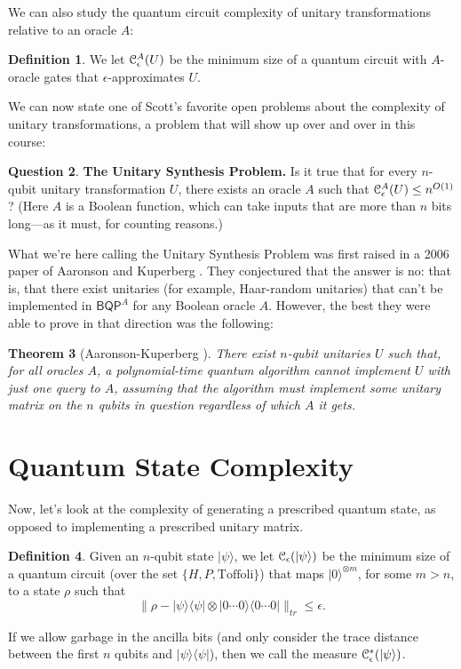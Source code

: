 \documentclass[12pt]{report}
\theoremstyle{plain}
\newtheorem{theorem}{Theorem}[section]
\theoremstyle{definition}
\newtheorem{definition}[theorem]{Definition}
\newtheorem{question}[theorem]{Question}
\renewcommand{\ket}[1]{|#1\rangle}
\newcommand{\ketbra}[2]{|#1\rangle\!\langle#2|}
\begin{document}
We can also study the quantum circuit complexity of unitary transformations relative to an oracle $A$:

\begin{definition}
We let ${\cal C}^A_{\epsilon}(U)$ be the minimum size of a quantum circuit with $A$-oracle gates that $\epsilon$-approximates $U$.
\end{definition}

We can now state one of Scott's favorite open problems about the complexity of unitary transformations, a problem that will show up over and over in this course:

\begin{question}
{\bf The Unitary Synthesis Problem.} Is it true that for every $n$-qubit unitary transformation $U$, there exists an oracle $A$ such that ${\cal C}^A_{\epsilon}(U)\leq n^{O(1)}$? (Here $A$ is a Boolean function, which can take inputs that are more than $n$ bits long---as it must, for counting reasons.)
\end{question}

What we're here calling the Unitary Synthesis Problem was first raised in a 2006 paper of Aaronson and Kuperberg \cite{ak}.  They conjectured that the answer is no: that is, that there exist unitaries (for example, Haar-random unitaries) that can't be implemented in $\mathsf{BQP}^A$ for any Boolean oracle $A$. However, the best they were able to prove in that direction was the following:

\begin{theorem}[Aaronson-Kuperberg \cite{ak}]
There exist $n$-qubit unitaries $U$ such that, for all oracles $A$, a polynomial-time quantum algorithm cannot implement $U$ with just one query to $A$, assuming that the algorithm must implement {\em some} unitary matrix on the $n$ qubits in question regardless of which $A$ it gets.
\end{theorem}

\section{Quantum State Complexity}

Now, let's look at the complexity of generating a prescribed quantum state, as opposed to implementing a prescribed unitary matrix.

\begin{definition}
Given an $n$-qubit state $\ket{\psi}$, we let $\cal C_{\epsilon}(\ket{\psi})$ be the minimum size of a quantum circuit (over the set $\{H,P,\mbox{Toffoli}\}$) that maps $\ket{0}^{\otimes m}$, for some $m>n$, to a state $\rho$ such that
\[
\|\rho-\ketbra{\psi}{\psi}\otimes \ketbra{0\cdots 0}{0 \cdots 0} \|_{tr}\leq\epsilon .
\]

If we allow garbage in the ancilla bits (and only consider the trace distance between the first $n$ qubits and $\ketbra{\psi}{\psi}$), then we call the measure $\cal C^*_{\epsilon}(\ket{\psi})$.
\end{definition}
\end{document}
